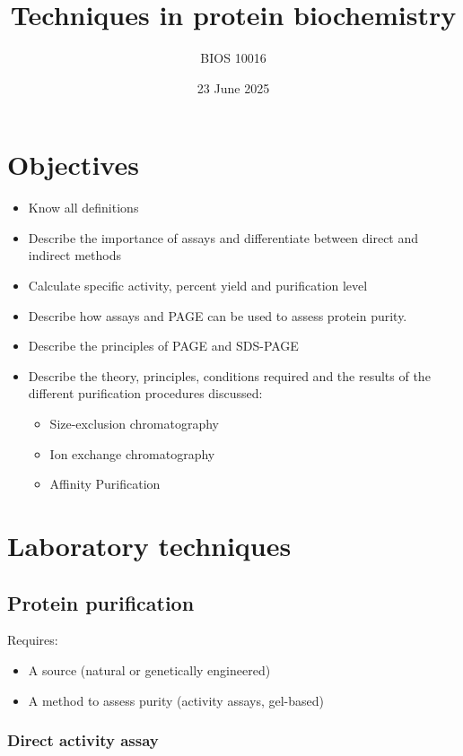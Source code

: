 \documentclass[letterpaper, 12pt]{article}
\title{Techniques in protein biochemistry}
\author{BIOS 10016}
\date{23 June 2025}
\begin{document}
\maketitle

\section*{Objectives}

\begin{itemize}
\item Know all definitions
\item Describe the importance of assays and differentiate between direct and indirect methods
\item Calculate specific activity, percent yield and purification level
\item Describe how assays and PAGE can be used to assess protein purity.
\item Describe the principles of PAGE and SDS-PAGE
\item Describe the theory, principles, conditions required and the results of the different purification procedures discussed:
\begin{itemize}
\item Size-exclusion chromatography
\item Ion exchange chromatography
\item Affinity Purification
\end{itemize}
\end{itemize}

\newpage

\section*{Laboratory techniques}

\subsection*{Protein purification}
Requires:

\begin{itemize}
\item A source (natural or genetically engineered)
\item A method to assess purity (activity assays, gel-based)
\end{itemize}

\subsubsection*{Direct activity assay}
\end{document}
